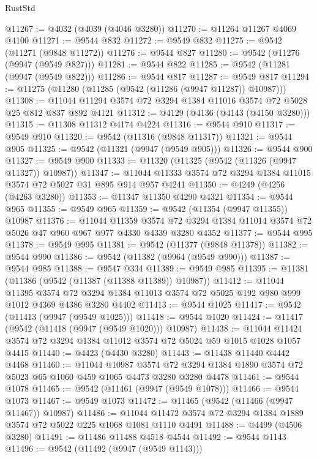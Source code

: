 \begin{lexlean}{RustStd}
\begin{coremodule}
{\begin{coremodule}
{{{{{{{{{{{{{{{{{{{{{{{{{{{{{{{{{@11267 := @4032 (@4039 (@4046 @3280))
@11270 := @11264 @11267 @4069 @4100
@11271 := @9544 @832
@11272 := @9549 @832
@11275 := @9542 (@11271 (@9848 @11272))
@11276 := @9544 @827
@11280 := @9542 (@11276 (@9947 (@9549 @827)))
@11281 := @9544 @822
@11285 := @9542 (@11281 (@9947 (@9549 @822)))
@11286 := @9544 @817
@11287 := @9549 @817
@11294 := @11275 (@11280 (@11285 (@9542 (@11286 (@9947 @11287)) @10987)))
@11308 := @11044 @11294 @3574 @72 @3294 @1384 @11016 @3574 @72 @5028 @25 @812 @837 @892 @4121
@11312 := @4129 (@4136 (@4143 (@4150 @3280)))
@11315 := @11308 @11312 @4174 @4224
@11316 := @9544 @910
@11317 := @9549 @910
@11320 := @9542 (@11316 (@9848 @11317))
@11321 := @9544 @905
@11325 := @9542 (@11321 (@9947 (@9549 @905)))
@11326 := @9544 @900
@11327 := @9549 @900
@11333 := @11320 (@11325 (@9542 (@11326 (@9947 @11327)) @10987))
@11347 := @11044 @11333 @3574 @72 @3294 @1384 @11015 @3574 @72 @5027 @31 @895 @914 @957 @4241
@11350 := @4249 (@4256 (@4263 @3280))
@11353 := @11347 @11350 @4290 @4321
@11354 := @9544 @965
@11355 := @9549 @965
@11359 := @9542 (@11354 (@9947 @11355)) @10987
@11376 := @11044
    @11359
    @3574
    @72
    @3294
    @1384
    @11014
    @3574
    @72
    @5026
    @47
    @960
    @967
    @977
    @4330
    @4339
    @3280
    @4352
@11377 := @9544 @995
@11378 := @9549 @995
@11381 := @9542 (@11377 (@9848 @11378))
@11382 := @9544 @990
@11386 := @9542 (@11382 (@9964 (@9549 @990)))
@11387 := @9544 @985
@11388 := @9547 @334
@11389 := @9549 @985
@11395 := @11381 (@11386 (@9542 (@11387 (@11388 @11389)) @10987))
@11412 := @11044
    @11395
    @3574
    @72
    @3294
    @1384
    @11013
    @3574
    @72
    @5025
    @192
    @980
    @999
    @1012
    @4369
    @4386
    @3280
    @4402
@11413 := @9544 @1025
@11417 := @9542 (@11413 (@9947 (@9549 @1025)))
@11418 := @9544 @1020
@11424 := @11417 (@9542 (@11418 (@9947 (@9549 @1020))) @10987)
@11438 := @11044 @11424 @3574 @72 @3294 @1384 @11012 @3574 @72 @5024 @59 @1015 @1028 @1057 @4415
@11440 := @4423 (@4430 @3280)
@11443 := @11438 @11440 @4442 @4468
@11460 := @11044
    @10987
    @3574
    @72
    @3294
    @1384
    @1890
    @3574
    @72
    @5023
    @65
    @1060
    @459
    @1065
    @4473
    @3280
    @3280
    @4478
@11461 := @9544 @1078
@11465 := @9542 (@11461 (@9947 (@9549 @1078)))
@11466 := @9544 @1073
@11467 := @9549 @1073
@11472 := @11465 (@9542 (@11466 (@9947 @11467)) @10987)
@11486 := @11044 @11472 @3574 @72 @3294 @1384 @1889 @3574 @72 @5022 @225 @1068 @1081 @1110 @4491
@11488 := @4499 (@4506 @3280)
@11491 := @11486 @11488 @4518 @4544
@11492 := @9544 @1143
@11496 := @9542 (@11492 (@9947 (@9549 @1143)))
}}}}}}}}}}}}}}}}}}}}}}}}}}}}}}}}}
\end{coremodule}}
\end{coremodule}
\end{lexlean}
